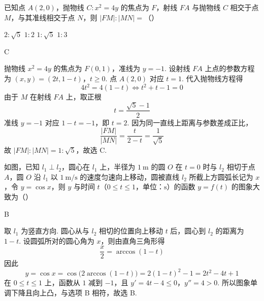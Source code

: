 \begin{problem}
已知点 \(A(2,0)\)，抛物线 \(C: x^2 = 4y\) 的焦点为 \(F\)，射线 \(FA\) 与抛物线 \(C\) 相交于点 \(M\)，与其准线相交于点 \(N\)，则 \(|FM|: |MN| =\)（\quad）

\choices
    {\(2:\sqrt{5}\)}
    {\(1:2\)}
    {\( 1 : \sqrt{5} \)}
    {\(1:3\)}
\end{problem}

\begin{answer}
C
\end{answer}

\begin{solution}
抛物线 \(x^{2}=4y\) 的焦点为 \(F(0,1)\)，准线为 \(y=-1\). 设射线 \(FA\) 上点的参数方程为
\((x,y)=(2t,1-t)\)，\(t\geqslant0\).
点 \(A(2,0)\) 对应 \(t=1\). 代入抛物线方程得
\[
4t^{2}=4(1-t)\iff t^{2}+t-1=0
\]
由于 \(M\) 在射线 \(FA\) 上，取正根
\[
t=\frac{\sqrt5-1}{2}
\]
准线 \(y=-1\) 对应 \(1-t=-1\)，即 \(t=2\). 因为同一直线上距离与参数差成正比，
\[
\frac{|FM|}{|MN|}=\frac{t}{2-t}=\frac{1}{\sqrt5}
\]
故 \(|FM|:|MN|=1:\sqrt5\)，故选 C.
\end{solution}

\begin{problem}
如图，已知 \(l_{1} \perp l_{2}\)，圆心在 \(l_{1}\) 上，半径为 \(1 \mathrm{~m}\) 的圆 \(O\) 在 \(t = 0\) 时与 \(l_{2}\) 相切于点 \(A\)，圆 \(O\) 沿 \(l_{1}\) 以 \(1 \mathrm{~m} / \mathrm{s}\) 的速度匀速向上移动，圆被直线 \(l_{2}\) 所截上方圆弧长记为 \(x\)，令 \(y = \cos x\)，则 \(y\) 与时间 \(t\)（\(0 \leqslant t \leqslant 1\)，单位：\(\mathrm{s}\)）的函数 \(y = f(t)\) 的图象大致为（\quad）

\FloatBarrier

    {}
    {}
    {}
\end{problem}

\begin{answer}
B
\end{answer}

\begin{solution}
取 \(l_{1}\) 为竖直方向. 圆心从与 \(l_{2}\) 相切的位置向上移动 \(t\) 后，圆心到 \(l_{2}\) 的距离为 \(1-t\). 设圆弧所对的圆心角为 \(x\)，则由直角三角形得
\[
\frac{x}{2}=\arccos(1-t)
\]
因此
\[
y=\cos x=\cos\bigl(2\arccos(1-t)\bigr)
 =2(1-t)^{2}-1=2t^{2}-4t+1
\]
在 \(0\leqslant t\leqslant1\) 上，函数从 \(1\) 减到 \(-1\)，且
\(y'=4t-4\leqslant0\)，\(y''=4>0\).
所以图象单调下降且向上凸，与选项 B 相符，故选 B.
\end{solution}

